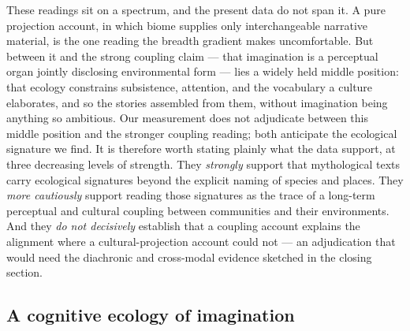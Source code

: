 \documentclass[11pt,a4paper]{article}
\begin{document}
These readings sit on a spectrum, and the present data do not span
it. A pure projection account, in which biome supplies only
interchangeable narrative material, is the one reading the breadth
gradient makes uncomfortable. But between it and the strong coupling
claim --- that imagination is a perceptual organ jointly disclosing
environmental form --- lies a widely held middle position: that
ecology constrains subsistence, attention, and the vocabulary a
culture elaborates, and so the stories assembled from them, without
imagination being anything so ambitious. Our measurement does not
adjudicate between this middle position and the stronger coupling
reading; both anticipate the ecological signature we find. It is
therefore worth stating plainly what the data support, at three
decreasing levels of strength. They \emph{strongly} support that
mythological texts carry ecological signatures beyond the explicit
naming of species and places. They \emph{more cautiously} support
reading those signatures as the trace of a long-term perceptual and
cultural coupling between communities and their environments. And they
\emph{do not decisively} establish that a coupling account explains
the alignment where a cultural-projection account could not --- an
adjudication that would need the diachronic and cross-modal evidence
sketched in the closing section.

\subsection*{A cognitive ecology of imagination}
\end{document}
